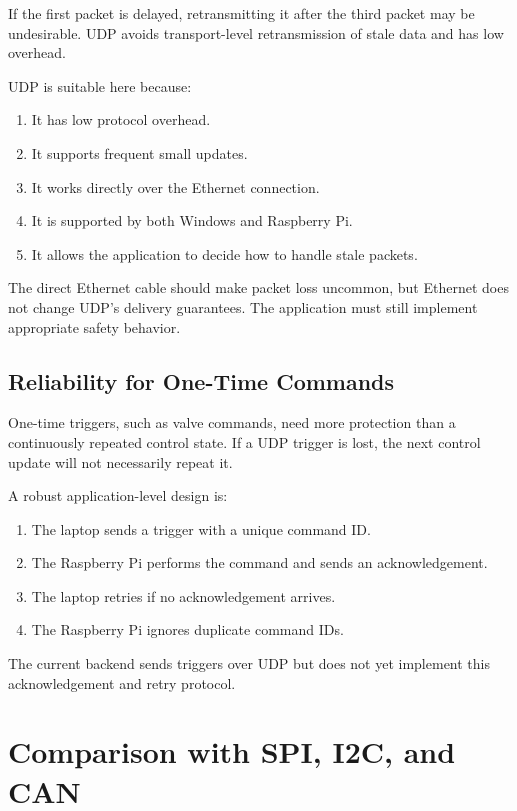 \documentclass[11pt]{article}
\begin{document}
If the first packet is delayed, retransmitting it after the third packet may
be undesirable. UDP avoids transport-level retransmission of stale data and
has low overhead.

UDP is suitable here because:

\begin{enumerate}[leftmargin=*]
    \item It has low protocol overhead.
    \item It supports frequent small updates.
    \item It works directly over the Ethernet connection.
    \item It is supported by both Windows and Raspberry Pi.
    \item It allows the application to decide how to handle stale packets.
\end{enumerate}

The direct Ethernet cable should make packet loss uncommon, but Ethernet does
not change UDP's delivery guarantees. The application must still implement
appropriate safety behavior.

\subsection{Reliability for One-Time Commands}

One-time triggers, such as valve commands, need more protection than a
continuously repeated control state. If a UDP trigger is lost, the next
control update will not necessarily repeat it.

A robust application-level design is:

\begin{enumerate}[leftmargin=*]
    \item The laptop sends a trigger with a unique command ID.
    \item The Raspberry Pi performs the command and sends an acknowledgement.
    \item The laptop retries if no acknowledgement arrives.
    \item The Raspberry Pi ignores duplicate command IDs.
\end{enumerate}

The current backend sends triggers over UDP but does not yet implement this
acknowledgement and retry protocol.

\section{Comparison with SPI, I2C, and CAN}
\end{document}
